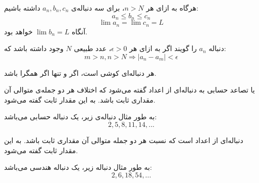 \begin{THEOREM}
\p
{}
هرگاه به ازای هر 
$n > N$،
برای سه دنباله‌ی
$a_n , b_n , c_n$
داشته باشیم:
$$a_n \leq b_n \leq c_n$$
$$\lim a_n = \lim c_n = L$$
آنگاه $\lim b_n = L$ خواهد بود.
\end{THEOREM}


\begin{DEFINITION}
	\p
دنباله 
$a_n$
را
گویند اگر به ازای هر
$\epsilon > 0$،
عدد طبیعی
$N$
وجود داشته باشد که:
$$m > n, n > N \Rightarrow |a_n - a_m| < \epsilon$$
\end{DEFINITION}


  
    \begin{THEOREM}
      هر دنباله‌ای کوشی است، اگر و تنها اگر همگرا باشد.
    \end{THEOREM}




\begin{DEFINITION}
    \p
    یا تصاعد حسابی به دنباله‌ای از اعداد گفته می‌شود که اختلاف هر دو جمله‌ی متوالی آن مقداری ثابت باشد. به این مقدار ثابت 
      گفته می‌شود.
\end{DEFINITION}
  \p
به طور مثال دنباله‌ی زیر، یک دنباله‌ حسابی می‌باشد:
$$2, 5, 8, 11, 14, ...$$







\begin{DEFINITION}
    \p
    دنباله‌ای از اعداد است که نسبت هر دو جمله متوالی آن مقداری ثابت باشد. به این مقدار ثابت 
  گفته می‌شود.    
\end{DEFINITION}
  \p
به طور مثال دنباله زیر، یک دنباله هندسی می‌باشد:
$$2, 6, 18, 54, ...$$




